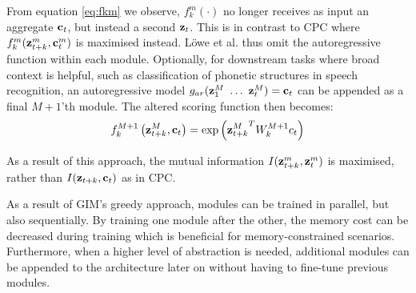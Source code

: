 		From equation \ref{eq:fkm} we observe, $f_k^m( \cdot )$ no longer receives as input an aggregate $\mathbf{c}_t$, but instead a second $\mathbf{z}_t$. This is in contrast to CPC where $f_k^m(\mathbf{z}_{t+k}^m,\mathbf{c}_t^m)$ is maximised instead. Löwe et al. thus omit the autoregressive function within each module. Optionally, for downstream tasks where broad context is helpful, such as classification of phonetic structures in speech recognition, an autoregressive model $g_{ar}(\mathbf{z}_1^M ~ \dots ~ \mathbf{z}_t^M) = \mathbf{c}_t$ can be appended as a final $M+1$'th module. The altered scoring function then becomes:
		$$
		f_k^{M+1}\left(\mathbf{z}_{t+k}^M, \mathbf{c}_t \right)=\exp \left({\mathbf{z}_{t+k}^M}^T W_k^{M+1} c_t \right)
		$$

			As a result of this approach, the mutual information $I(\mathbf{z}_{t+k}^m,\mathbf{z}_t^m)$ is maximised, rather than $I(\mathbf{z}_{t+k}, \mathbf{c}_t)$ as in CPC. %
		
			As a result of GIM's greedy approach, modules can be trained in parallel, but also sequentially. By training one module after the other, the memory cost can be decreased during training which is beneficial for memory-constrained scenarios. Furthermore, when a higher level of abstraction is needed, additional modules can be appended to the architecture later on without having to fine-tune previous modules.

	

